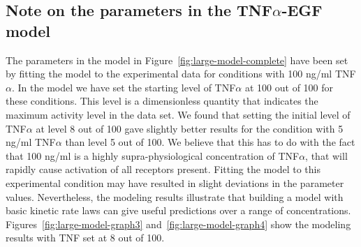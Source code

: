 \documentclass{bmcart}
\begin{document}
\subsection*{Note on the parameters in the TNF$\alpha$-EGF model}\label{suppl:parameters-tnf-egf}
The parameters in the model in Figure~\ref{fig:large-model-complete}
have been set by fitting the model to the experimental data for conditions with 100 ng/ml TNF$\alpha$.
In the model we have set the starting level of TNF$\alpha$ at 100 out of 100 for these conditions.
This level is a dimensionless quantity that indicates the maximum activity level in the data set.
We found that setting the initial level of TNF$\alpha$ at level 8 out of 100 gave slightly better results for the
condition with 5 ng/ml TNF$\alpha$ than level 5 out of 100. We believe that this has to do with the fact that
100 ng/ml is a highly supra-physiological concentration of TNF$\alpha$, that will rapidly cause activation of all
receptors present. Fitting the model to this experimental condition may have resulted in slight deviations
in the parameter values. Nevertheless, the modeling results illustrate that building a model with basic
kinetic rate laws can give useful predictions over a range of concentrations. Figures~\ref{fig:large-model-graph3} and~\ref{fig:large-model-graph4}
show the modeling results with TNF set at 8 out of 100.
\end{document}
